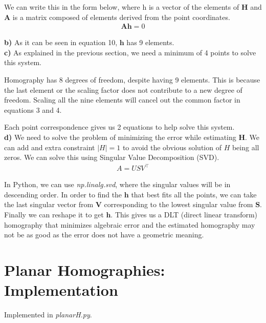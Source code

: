 \documentclass[a4paper]{article}
\begin{document}
We can write this in the form below, where h is a vector of the elements of $\mathbf{H}$ and $\mathbf{A}$ is a matrix composed of elements derived from the point coordinates.
\begin{gather}
    \mathbf{Ah} = 0
\end{gather}

\textbf{b)} As it can be seen in equation 10, $\mathbf{h}$ has 9 elements.\\

\textbf{c)} As explained in the previous section, we need a minimum of 4 points to solve this system. 

Homography has 8 degrees of freedom, despite having 9 elements. This is because the last element or the scaling factor does not contribute to a new degree of freedom. Scaling all the nine elements will cancel out the common factor in equations 3 and 4. 

Each point correspondence gives us 2 equations to help solve this system. \\

\textbf{d)} We need to solve the problem of minimizing the error while estimating $\mathbf{H}$. We can add and extra constraint $|H|=1$ to avoid the obvious solution of $H$ being all zeros. We can solve this using Singular Value Decomposition (SVD).
\begin{gather}
A = USV^\top
\end{gather}

In Python, we can use \textit{np.linalg.svd}, where the singular values will be in descending order. In order to find the $\mathbf{h}$ that best fits all the points, we can take the last singular vector from $\mathbf{V}$ corresponding to the lowest singular value from $\mathbf{S}$. Finally we can reshape it to get $\mathbf{h}$. This gives us a DLT (direct linear transform) homography that minimizes algebraic error and the estimated homography may not be as good as the error does not have a geometric meaning.

\section{Planar Homographies: Implementation}
Implemented in \textit{planarH.py}.
\end{document}
